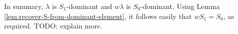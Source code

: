 \documentclass[reqno]{amsart} 
\begin{document}
In summary, $\lambda$ is $S_1$-dominant and $w \lambda$ is $S_0$-dominant.  Using Lemma \ref{lem:recover-S-from-dominant-element}, it follows easily that $w S_1 = S_0$, as required.  TODO: explain more.
\end{document}
